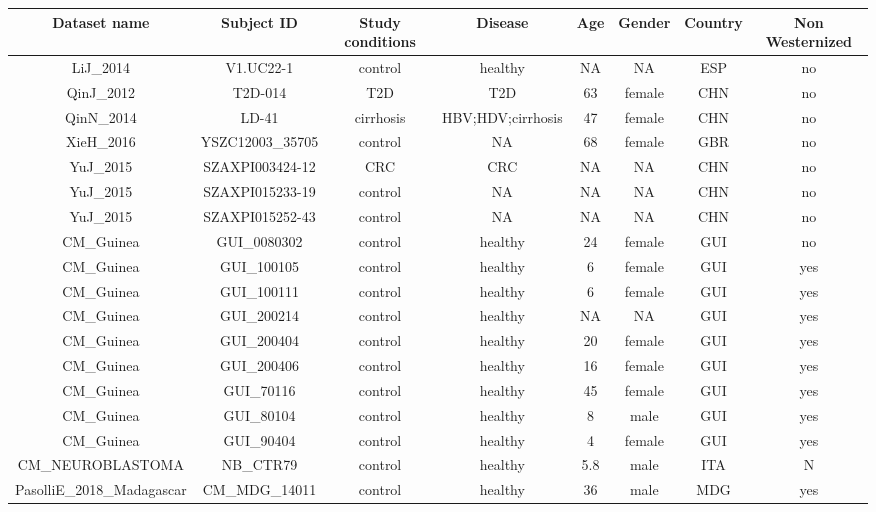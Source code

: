 \documentclass[11pt]{article}
\begin{document}
\begin{landscape}
\begin{table}[h]
\begin{center}
\small
    \begin{tabular}{|c|c|c|c|c|c|c|c|}
        \hline
        Dataset name & Subject ID &  Study conditions & Disease & Age & Gender & Country & Non Westernized \\
        \hline
        LiJ\_2014 & V1.UC22-1 & control & healthy & NA & NA & ESP & no\\
        QinJ\_2012 & T2D-014 &  T2D &  T2D &  63 &  female & CHN & no\\
        QinN\_2014 &  LD-41	& cirrhosis &  HBV;HDV;cirrhosis &  47 &  female & CHN & no\\
        XieH\_2016 &  YSZC12003\_35705 &  control &  NA &  68 &  female & GBR & no\\
        YuJ\_2015 & SZAXPI003424-12 &  CRC &  CRC &  NA &  NA & CHN & no\\
        YuJ\_2015 & SZAXPI015233-19 &  control &  NA &  NA &  NA & CHN & no\\
        YuJ\_2015 & SZAXPI015252-43 &  control &  NA &  NA &  NA & CHN & no\\
        CM\_Guinea &GUI\_0080302 & control & healthy & 24 & female & GUI & no\\
        CM\_Guinea & GUI\_100105 & control & healthy & 6 & female & GUI & yes \\
        CM\_Guinea & GUI\_100111 & control & healthy & 6 & female & GUI & yes\\
        CM\_Guinea & GUI\_200214 & control & healthy & NA & NA  & GUI & yes\\
        CM\_Guinea & GUI\_200404  & control & healthy & 20 & female & GUI & yes\\
        CM\_Guinea & GUI\_200406 & control & healthy & 16 & female  & GUI & yes\\
        CM\_Guinea & GUI\_70116  & control & healthy & 45 & female  & GUI & yes\\
        CM\_Guinea & GUI\_80104 & control & healthy & 8 & male  & GUI & yes\\
        CM\_Guinea & GUI\_90404 & control & healthy & 4 & female & GUI & yes\\
        CM\_NEUROBLASTOMA & NB\_CTR79 & control & healthy & 5.8 & male & ITA & N\\
        PasolliE\_2018\_Madagascar & CM\_MDG\_14011 & control & healthy & 36 & male & MDG & yes\\

\end{tabular}
\end{center}
\end{table}
\end{landscape}
\end{document}
